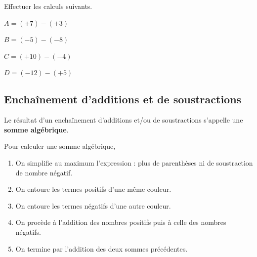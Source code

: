 \documentclass[a4paper]{book}
\begin{document}
    \begin{exemple}
        Effectuer les calculs suivants.

        \medskip

        \begin{minipage}{0.24\linewidth}
            $A = (+7) - (+3)$

            \vspace{2cm}
        \end{minipage}
        \hfill\vline\hfill
        \begin{minipage}{0.24\linewidth}
            $B = (-5) - (-8)$

            \vspace{2cm}
        \end{minipage}
        \hfill\vline\hfill
        \begin{minipage}{0.24\linewidth}
            $C = (+10) - (-4)$

            \vspace{2cm}
        \end{minipage}
        \hfill\vline\hfill
        \begin{minipage}{0.24\linewidth}
            $D = (-12) - (+5)$

            \vspace{2cm}
        \end{minipage}
    \end{exemple}


\subsection{Enchaînement d'additions et de soustractions}
    
    \begin{definition}
        Le résultat d'un enchaînement d’additions et/ou de soustractions s'appelle une \textbf{somme algébrique}.
    \end{definition}

    \begin{methode}
        Pour calculer une somme algébrique,
        \begin{enumerate}
            \item On simplifie au maximum l'expression : plus de parenthèses ni de soustraction de nombre négatif.
            \item On entoure les termes positifs d'une même couleur.
            \item On entoure les termes négatifs d'une autre couleur.
            \item On procède à l'addition des nombres positifs puis à celle des nombres négatifs.
            \item On termine par l'addition des deux sommes précédentes.
        \end{enumerate}
    \end{methode}
\end{document}
